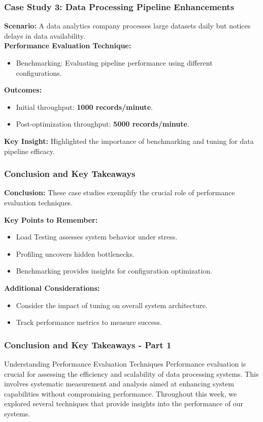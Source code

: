 \documentclass[aspectratio=169]{beamer}
\begin{document}
\begin{frame}[fragile]
  \frametitle{Case Study 3: Data Processing Pipeline Enhancements}
  \textbf{Scenario:} A data analytics company processes large datasets daily but notices delays in data availability.\\

  \textbf{Performance Evaluation Technique:}
  \begin{itemize}
    \item Benchmarking: Evaluating pipeline performance using different configurations.
  \end{itemize}

  \textbf{Outcomes:}
  \begin{itemize}
    \item Initial throughput: \textbf{1000 records/minute}.
    \item Post-optimization throughput: \textbf{5000 records/minute}.
  \end{itemize}

  \textbf{Key Insight:} Highlighted the importance of benchmarking and tuning for data pipeline efficacy.
\end{frame}

\begin{frame}[fragile]
  \frametitle{Conclusion and Key Takeaways}
  \textbf{Conclusion:} These case studies exemplify the crucial role of performance evaluation techniques.
  
  \textbf{Key Points to Remember:}
  \begin{itemize}
    \item Load Testing assesses system behavior under stress.
    \item Profiling uncovers hidden bottlenecks.
    \item Benchmarking provides insights for configuration optimization.
  \end{itemize}

  \textbf{Additional Considerations:}
  \begin{itemize}
    \item Consider the impact of tuning on overall system architecture.
    \item Track performance metrics to measure success.
  \end{itemize}
\end{frame}

\begin{frame}[fragile]
  \frametitle{Conclusion and Key Takeaways - Part 1}
  \begin{block}{Understanding Performance Evaluation Techniques}
    Performance evaluation is crucial for assessing the efficiency and scalability of data processing systems. 
    This involves systematic measurement and analysis aimed at enhancing system capabilities without compromising performance. 
    Throughout this week, we explored several techniques that provide insights into the performance of our systems.
  \end{block}
\end{frame}
\end{document}
